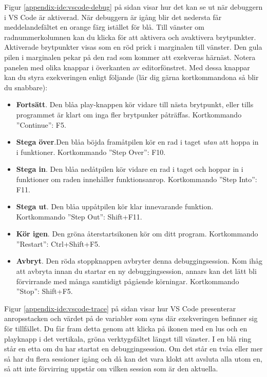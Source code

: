 Figur \ref{appendix-ide:vscode-debug} på sidan \pageref{appendix-ide:vscode-debug} visar hur det kan se ut när debuggern i VS Code är aktiverad. När debuggern är igång blir det nedersta får meddelandefältet en orange färg istället för blå. Till vänster om radnummerkolumnen kan du klicka för att aktivera och avaktivera brytpunkter. Aktiverade brytpunkter visas som en röd prick i marginalen till vänster. Den gula pilen i marginalen pekar på den rad som kommer att exekveras härnäst. Notera panelen med olika knappar i överkanten av editorfönstret. Med dessa knappar kan du styra exekveringen enligt följande (lär dig gärna kortkommandona så blir du snabbare):
\begin{itemize}
  \item \textbf{Fortsätt}. Den blåa play-knappen kör vidare till nästa brytpunkt, eller tills programmet är klart om inga fler brytpunker påträffas. Kortkommando ''Continue'': F5.
  \item \textbf{Stega över}.Den blåa böjda framåtpilen kör en rad i taget \emph{utan} att hoppa in i funktioner.  Kortkommando ''Step Over'': F10.
  \item \textbf{Stega in}. Den blåa nedåtpilen kör vidare en rad i taget och hoppar in i funktioner om raden innehåller funktionsanrop. Kortkommando ''Step Into'': F11.
  \item \textbf{Stega ut}. Den blåa uppåtpilen kör klar innevarande funktion. Kortkommando ''Step Out'': Shift+F11.
  \item \textbf{Kör igen}. Den gröna återstartsikonen kör om ditt program. Kortkommando ''Restart'': Ctrl+Shift+F5.
  \item \textbf{Avbryt}. Den röda stoppknappen avbryter denna debuggingsession. Kom ihåg att avbryta innan du startar en ny debuggingsession, annars kan det lätt bli förvirrande med många samtidigt pågående körningar. Kortkommando ''Stop'': Shift+F5. 
\end{itemize}

Figur \ref{appendix-ide:vscode-trace} på sidan \pageref{appendix-ide:vscode-trace} visar hur VS Code presenterar anropsstacken och värdet på de variabler som syns där exekveringen befinner sig för tillfället. Du får fram detta genom att klicka på ikonen med en lus och en playknapp i det vertikala, gröna verktygsfältet längst till vänster. I en blå ring står en etta om du har startat en debuggingsession. Om det står en tvåa eller mer så har du flera sessioner igång och då kan det vara klokt att avsluta alla utom en, så att inte förvirring uppstår om vilken session som är den aktuella. 

